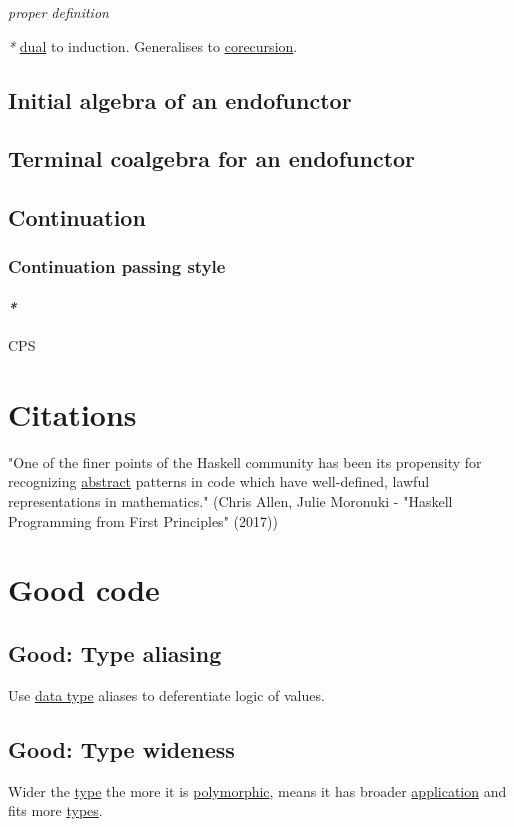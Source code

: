 \documentclass[a4paper,14pt,oneside]{book}
\begin{document}
\emph{proper definition}

\emph{*} \hyperref[org7205c82]{dual} to induction.
Generalises to \hyperref[org12f9d9f]{corecursion}.

\chapter{\label{org8b568fd}Initial algebra of an endofunctor}
\label{sec:org21cb50d}
\chapter{\label{org31ede4e}Terminal coalgebra for an endofunctor}
\label{sec:org4c20e11}
\chapter{Continuation}
\label{sec:org96bf025}
\section{Continuation passing style}
\label{sec:orga62f351}

\subsection{\emph{*}}
\label{sec:orge90174b}

CPS

\part{Citations}
\label{sec:org10c7326}

"One of the finer points of the Haskell community has been
its propensity for recognizing \hyperref[orgb15edfe]{abstract} patterns in code which
have well-defined, lawful representations in mathematics." (Chris Allen, Julie Moronuki - "Haskell Programming from First Principles" (2017))

\part{Good code}
\label{sec:orge2cbf31}
\chapter{\label{org4865a13}Good: Type aliasing}
\label{sec:org3bbef05}
Use \hyperref[orgae14939]{data type} aliases to deferentiate logic of values.

\chapter{\label{orgc83480b}Good: Type wideness}
\label{sec:org8ce1614}
Wider the \hyperref[org8fd7417]{type} the more it is \hyperref[org9c16814]{polymorphic}, means it has broader \hyperref[orge8fdbe0]{application} and fits more \hyperref[org8e4b23c]{types}.
\end{document}

